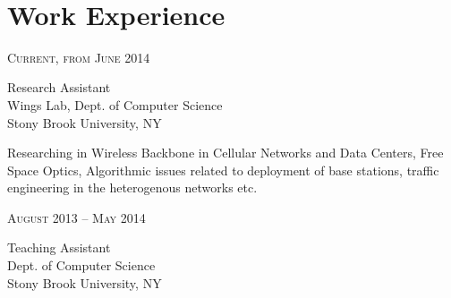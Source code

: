 \documentclass[10pt]{article} %
\begin{document}
\color{text1} %


\par{\\ %
\par} %
	

\begin{minipage}[t]{0.5\textwidth} %
\vspace{0pt} %
	

\section{Work Experience} 
{\raggedleft\textsc{Current, from June 2014}\par}

{\raggedright\large Research Assistant\\
{Wings Lab, Dept. of Computer Science \\ Stony Brook University, NY}\\[5pt]}

\normalsize{Researching in Wireless Backbone in Cellular Networks and
Data Centers, Free Space Optics, Algorithmic issues related to deployment of
base stations, traffic engineering in the heterogenous networks etc.}

{\raggedleft\textsc{August 2013 -- May 2014}\par}

{\raggedright\large Teaching Assistant\\
{Dept. of Computer Science \\ Stony Brook University, NY}\\[5pt]}


\end{minipage}
\end{document}
